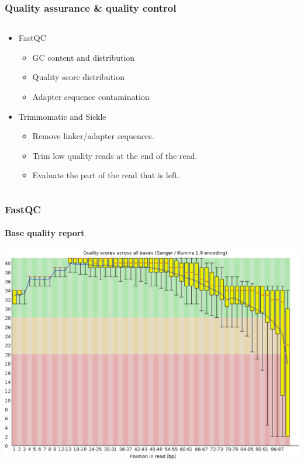 \documentclass{beamer}			  %
\begin{document}
\begin{frame}
\frametitle{Quality assurance \& quality control}
  \begin{columns}[T]
	\begin{column}{.72\textwidth}
	\begin{itemize}
		\item FastQC
		\begin{itemize}
			\item GC content and distribution
			\item Quality score distribution
			\item Adapter sequence contamination
		\end{itemize}
		\item Trimmomatic and Sickle
		\begin{itemize}
			\item Remove linker/adapter sequences.
			\item Trim low quality reads at the end of the read.
			\item Evaluate the part of the read that is left.
		\end{itemize}
	\end{itemize}
	\end{column}
	\begin{column}{.28\textwidth}
	\end{column}
  \end{columns}
\end{frame}

\begin{frame}
\frametitle{FastQC}
\framesubtitle{Base quality report}
	\begin{center}
		\includegraphics[height=0.75\textheight]{figures/dge_03cp.png}
	\end{center}
\end{frame}
\end{document}
